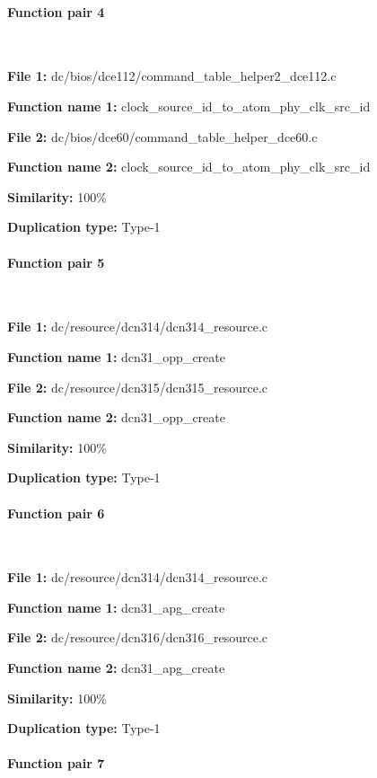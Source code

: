 \paragraph{Function pair 4 }  

\

\textbf{File 1:} dc/bios/dce112/command\_table\_helper2\_dce112.c

\textbf{Function name 1:} clock\_source\_id\_to\_atom\_phy\_clk\_src\_id

\textbf{File 2:} dc/bios/dce60/command\_table\_helper\_dce60.c

\textbf{Function name 2:} clock\_source\_id\_to\_atom\_phy\_clk\_src\_id

\textbf{Similarity:} 100\%

\textbf{Duplication type:} Type-1


\paragraph{Function pair 5 }  

\

\textbf{File 1:} dc/resource/dcn314/dcn314\_resource.c

\textbf{Function name 1:} dcn31\_opp\_create

\textbf{File 2:} dc/resource/dcn315/dcn315\_resource.c

\textbf{Function name 2:} dcn31\_opp\_create

\textbf{Similarity:} 100\%

\textbf{Duplication type:} Type-1


\paragraph{Function pair 6 }  

\

\textbf{File 1:} dc/resource/dcn314/dcn314\_resource.c

\textbf{Function name 1:} dcn31\_apg\_create

\textbf{File 2:} dc/resource/dcn316/dcn316\_resource.c

\textbf{Function name 2:} dcn31\_apg\_create

\textbf{Similarity:} 100\%
 
\textbf{Duplication type:} Type-1


\paragraph{Function pair 7 }  

